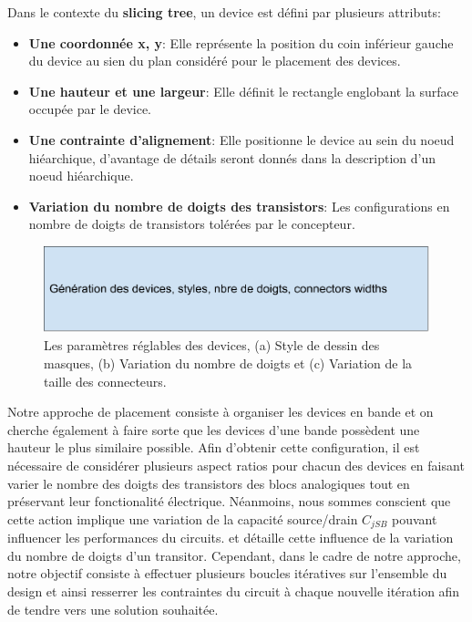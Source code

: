 Dans le contexte du \textbf{slicing tree}, un device est défini par plusieurs attributs:
\begin{itemize}
\item \textbf{Une coordonnée x, y}: Elle représente la position du coin inférieur gauche du device au sien du plan considéré pour le placement des devices.
\item \textbf{Une hauteur et une largeur}: Elle définit le rectangle englobant la surface occupée par le device.
\item \textbf{Une contrainte d'alignement}: Elle positionne le device au sein du noeud hiéarchique, d'avantage de détails seront donnés dans la description d'un noeud hiéarchique. 
\item \textbf{Variation du nombre de doigts des transistors}: Les configurations en nombre de doigts de transistors tolérées par le concepteur.
\end{itemize}

\begin{figure}[h]
\begin{center}
\includegraphics[height=0.11\textheight]{Figures/12.pdf}
\caption{Les paramètres réglables des devices, (a) Style de dessin des masques, (b) Variation du nombre de doigts et (c) Variation de la taille des connecteurs.}
\label{fig:12}
\end{center}
\end{figure} 
Notre approche de placement consiste à organiser les devices en bande et on cherche également à faire sorte que les devices d'une bande possèdent une hauteur le plus similaire possible. Afin d'obtenir cette configuration, il est nécessaire de considérer plusieurs aspect ratios pour chacun des devices en faisant varier le nombre des doigts des transistors des blocs analogiques tout en préservant leur fonctionalité électrique. Néanmoins, nous sommes conscient que cette action implique une variation de la capacité source/drain $C_{jSB}$ pouvant influencer les performances du circuits. \cite{Long2006} et \cite{Wu2014} détaille cette influence de la variation du nombre de doigts d'un transitor. Cependant, dans le cadre de notre approche, notre objectif consiste à effectuer plusieurs boucles itératives sur l'ensemble du design et ainsi resserrer les contraintes du circuit à chaque nouvelle itération afin de tendre vers une solution souhaitée. \newline
 
